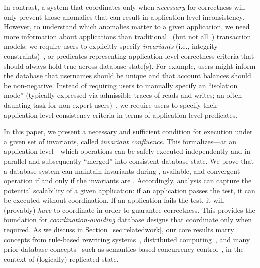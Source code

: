 
In contrast, a system that coordinates only when \textit{necessary}
for correctness will only prevent those anomalies that can result in
application-level inconsistency. However, to understand which
anomalies matter to a given application, we need more information
about applications than traditional~\cite{bernstein-book,gray-virtues}
(but not
all~\cite{eswaran-consistency,korth-serializability,decomp-semantics,garciamolina-semantics,activedb-book,ic-survey,ic-survey-two})
transaction models: we require users to explicitly specify
\textit{invariants} (i.e., integrity constraints)~\cite{traiger-tods},
or predicates representing application-level correctness criteria that
should always hold true across database state(s). For example, users
might inform the database that usernames should be unique and that
account balances should be non-negative. Instead of requiring users to
manually specify an ``isolation mode'' (typically expressed via
admissible traces of reads and writes; an often daunting task for
non-expert users)~\cite{consistency-borders}, we require users to
specify their application-level consistency criteria in terms of
application-level predicates.



In this paper, we present a necessary and sufficient condition for
\cfree execution under a given set of invariants, called
\textit{invariant confluence}. This \iconfluence formalizes---at an
application level---which operations can be safely executed
independently and in parallel and subsequently ``merged'' into
consistent database state. We prove that a database system can
maintain invariants during \cfree, available, and convergent operation
if and only if the invariants are \iconfluent. Accordingly,
\iconfluence analysis can capture the potential scalability of a given
application: if an application passes the \iconfluence test, it can be
executed without coordination. If an application fails the test, it
will (provably) \textit{have} to coordinate in order to guarantee
correctness. This provides the foundation for
\textit{coordination-avoiding} database designs that coordinate only
when required. As we discuss in Section~\ref{sec:relatedwork}, our
core results marry concepts from rule-based rewriting
systems~\cite{obs-confluence,termrewriting}, distributed
computing~\cite{herlihy-apologizing,gilbert-cap,hat-vldb}, and many
prior database concepts~\cite{activedb-book,ic-survey,ic-survey-two}
such as semantics-based concurrency
control~\cite{sdd1,decomp-semantics,badrinath-semantics,garciamolina-semantics,korth-serializability,atomictransactions,weihl-thesis},
in the context of (logically) replicated state.

